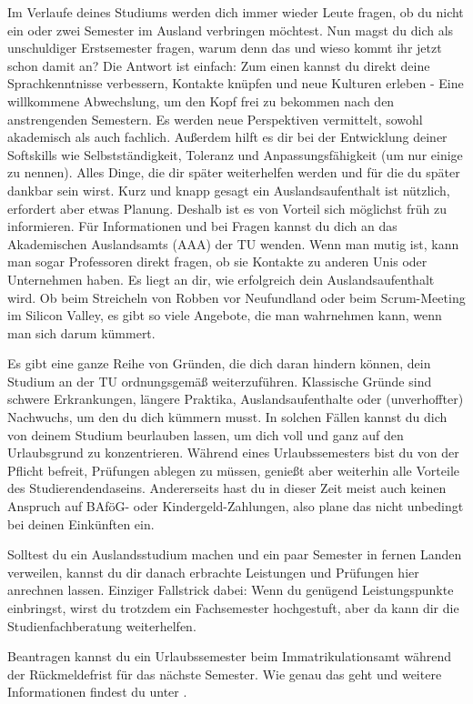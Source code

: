 Im Verlaufe deines Studiums werden dich immer wieder Leute fragen, ob du nicht ein oder zwei Semester im Ausland verbringen möchtest.
Nun magst du dich als unschuldiger Erstsemester fragen, warum denn das und wieso kommt ihr jetzt schon damit an?
Die Antwort ist einfach:
Zum einen kannst du direkt deine Sprachkenntnisse verbessern, Kontakte knüpfen und neue Kulturen erleben - Eine willkommene Abwechslung, um den Kopf frei zu bekommen nach den anstrengenden Semestern. Es werden neue Perspektiven vermittelt, sowohl akademisch als auch fachlich. Außerdem hilft es dir bei der Entwicklung deiner Softskills wie Selbstständigkeit, Toleranz und Anpassungsfähigkeit (um nur einige zu nennen). Alles Dinge, die dir später weiterhelfen werden und für die du später dankbar sein wirst.
Kurz und knapp gesagt ein Auslandsaufenthalt ist nützlich, erfordert aber etwas Planung.
Deshalb ist es von Vorteil sich möglichst früh zu informieren.
Für Informationen und bei Fragen kannst du dich an das Akademischen Auslandsamts (AAA) der TU  wenden.
Wenn man mutig ist, kann man sogar Professoren direkt fragen, ob sie Kontakte zu anderen Unis oder Unternehmen haben.
Es liegt an dir, wie erfolgreich dein Auslandsaufenthalt wird.
Ob beim Streicheln von Robben vor Neufundland oder beim Scrum-Meeting im Silicon Valley, es gibt so viele Angebote, die man wahrnehmen kann, wenn man sich darum kümmert.


Es gibt eine ganze Reihe von Gründen, die dich daran hindern können, dein Studium an der TU ordnungsgemäß weiterzuführen.
Klassische Gründe sind schwere Erkrankungen, längere Praktika, Auslandsaufenthalte oder (unverhoffter) Nachwuchs, um den du dich kümmern musst.
In solchen Fällen kannst du dich von deinem Studium beurlauben lassen, um dich voll und ganz auf den Urlaubsgrund zu konzentrieren.
Während eines Urlaubssemesters bist du von der Pflicht befreit, Prüfungen ablegen zu müssen, genießt aber weiterhin alle Vorteile des Studierendendaseins.
Andererseits hast du in dieser Zeit meist auch keinen Anspruch auf BAföG- oder Kindergeld-Zahlungen, also plane das nicht unbedingt bei deinen Einkünften ein.

Solltest du ein Auslandsstudium machen und ein paar Semester in fernen Landen verweilen, kannst du dir danach erbrachte Leistungen und Prüfungen hier anrechnen lassen.
Einziger Fallstrick dabei: Wenn du genügend Leistungspunkte einbringst, wirst du trotzdem ein Fachsemester hochgestuft, aber da kann dir die Studienfachberatung weiterhelfen.

Beantragen kannst du ein Urlaubssemester beim Immatrikulationsamt während der Rückmeldefrist für das nächste Semester.
Wie genau das geht und weitere Informationen findest du unter .
